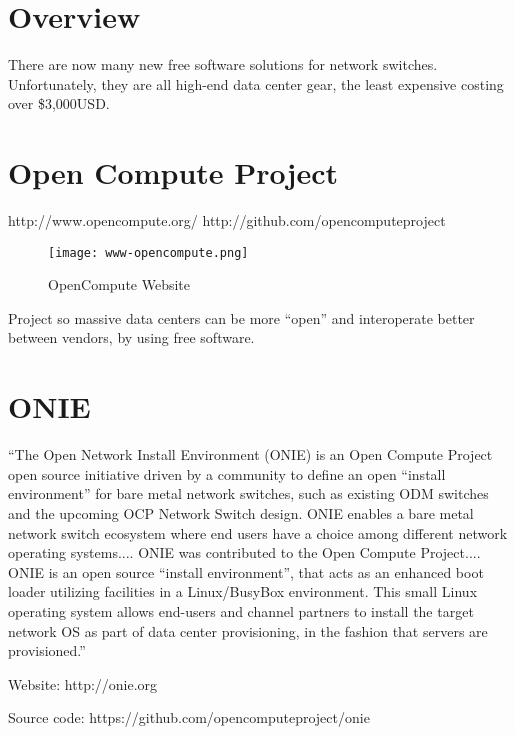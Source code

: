 %
%
%
%
%

\section{Overview}
There are now many new free software solutions for network switches.
Unfortunately, they are all high-end data center gear, the least expensive
costing over \$3,000USD.

\section{Open Compute Project}
http://www.opencompute.org/  http://github.com/opencomputeproject

\begin{figure}[h!]
\texttt{[image: www-opencompute.png]}
 \caption{OpenCompute Website}
 \label{fig:www-opencompute}
\end{figure}


Project so massive data centers can be more ``open'' and interoperate better
between vendors, by using free software.


\section{ONIE}
``The Open Network Install Environment (ONIE) is an Open Compute Project open source initiative driven by a community to define an open ``install environment'' for bare metal network switches, such as existing ODM switches and the upcoming OCP Network Switch design. ONIE enables a bare metal network switch ecosystem where end users have a choice among different network operating systems.... ONIE was contributed to the Open Compute Project.... ONIE is an open source ``install environment'', that acts as an enhanced boot loader utilizing facilities in a Linux/BusyBox environment. This small Linux operating system allows end-users and channel partners to install the target network OS as part of data center provisioning, in the fashion that servers are provisioned.''


Website: http://onie.org

Source code: https://github.com/opencomputeproject/onie

